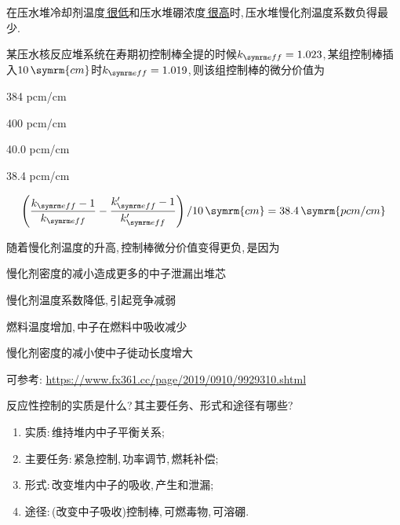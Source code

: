 \begin{exercise}
    在压水堆冷却剂温度\underline{{\kaishu \,很低}}和压水堆硼浓度\underline{{\kaishu \,很高}}时,\,压水堆慢化剂温度系数负得最少.\,
\end{exercise}

\begin{exercise}
    某压水核反应堆系统在寿期初控制棒全提的时候$\keff = 1.023$,\,某组控制棒插入$10\,\symrm{cm}$时$\keff = 1.019$,\,则该组控制棒的微分价值为\xparen
    \begin{xchoices}[showanswer=true]
        \item 384 pcm/cm
        \item 400 pcm/cm
        \item 40.0 pcm/cm
        \item* 38.4 pcm/cm
    \end{xchoices}
    \vspace*{1em}
    \begin{solution}
        \begin{equation*}
            \left(\frac{\keff - 1}{\keff} - \frac{\keff' - 1}{\keff'}\right)/10\,\symrm{cm} = 38.4\,\symrm{pcm/cm}
        \end{equation*}
    \end{solution}
\end{exercise}

\begin{exercise}
    随着慢化剂温度的升高,\,控制棒微分价值变得更负,\,是因为\xparen
    \begin{xchoices}[showanswer=true]
        \item 慢化剂密度的减小造成更多的中子泄漏出堆芯
        \item 慢化剂温度系数降低,\,引起竞争减弱
        \item 燃料温度增加,\,中子在燃料中吸收减少
        \item* 慢化剂密度的减小使中子徙动长度增大
    \end{xchoices}
    \noindent {\color{third}{【注】}} {\kaishu 可参考:\,\faLink\,\hyperlink{https://www.fx361.cc/page/2019/0910/9929310.shtml}{https://www.fx361.cc/page/2019/0910/9929310.shtml}}
\end{exercise}

\begin{exercise}
    反应性控制的实质是什么?\,其主要任务、形式和途径有哪些?\,
    \begin{solution}
        \begin{enumerate}[(1)]
            \item 实质:\,维持堆内中子平衡关系;\,
            \item 主要任务:\,紧急控制,\,功率调节,\,燃耗补偿;\,
            \item 形式:\,改变堆内中子的吸收,\,产生和泄漏;\,
            \item 途径:\,(改变中子吸收)控制棒,\,可燃毒物,\,可溶硼.\,
        \end{enumerate}
    \end{solution}
\end{exercise}

